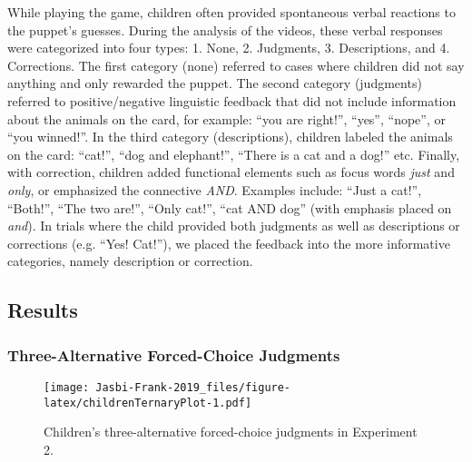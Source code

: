 \documentclass[,man,floatsintext]{apa6}
\begin{document}
While playing the game, children often provided spontaneous verbal reactions to the puppet's guesses. During the analysis of the videos, these verbal responses were categorized into four types: 1. None, 2. Judgments, 3. Descriptions, and 4. Corrections. The first category (none) referred to cases where children did not say anything and only rewarded the puppet. The second category (judgments) referred to positive/negative linguistic feedback that did not include information about the animals on the card, for example: \enquote{you are right!}, \enquote{yes}, \enquote{nope}, or \enquote{you winned!}. In the third category (descriptions), children labeled the animals on the card: \enquote{cat!}, \enquote{dog and elephant!}, \enquote{There is a cat and a dog!} etc. Finally, with correction, children added functional elements such as focus words \emph{just} and \emph{only}, or emphasized the connective \emph{AND}. Examples include: \enquote{Just a cat!}, \enquote{Both!}, \enquote{The two are!}, \enquote{Only cat!}, \enquote{cat AND dog} (with emphasis placed on \emph{and}). In trials where the child provided both judgments as well as descriptions or corrections (e.g. \enquote{Yes! Cat!}), we placed the feedback into the more informative categories, namely description or correction.

\hypertarget{results-1}{%
\subsection{Results}\label{results-1}}

\hypertarget{three-alternative-forced-choice-judgments}{%
\subsubsection{Three-Alternative Forced-Choice Judgments}\label{three-alternative-forced-choice-judgments}}

\begin{figure}
\centering
\texttt{[image: Jasbi-Frank-2019\_files/figure-latex/childrenTernaryPlot-1.pdf]}
\caption{\label{fig:childrenTernaryPlot}Children's three-alternative forced-choice judgments in Experiment 2.}
\end{figure}
\end{document}
